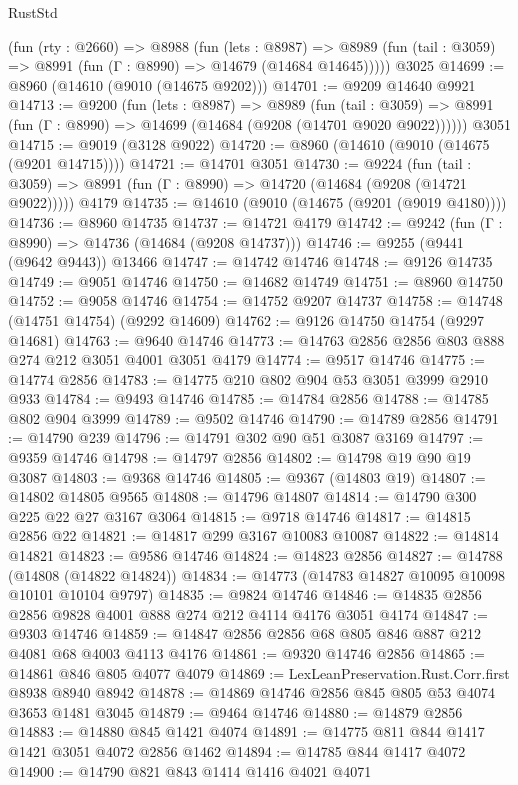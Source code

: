 \begin{lexlean}{RustStd}
\begin{coremodule}
    (fun (rty : @2660) =>
    @8988
      (fun (lets : @8987) =>
      @8989 (fun (tail : @3059) => @8991 (fun (Γ : @8990) => @14679 (@14684 @14645)))))
    @3025
@14699 := @8960 (@14610 (@9010 (@14675 @9202)))
@14701 := @9209 @14640 @9921
@14713 := @9200
    (fun (lets : @8987) =>
    @8989
      (fun (tail : @3059) =>
      @8991 (fun (Γ : @8990) => @14699 (@14684 (@9208 (@14701 @9020 @9022))))))
    @3051
@14715 := @9019 (@3128 @9022)
@14720 := @8960 (@14610 (@9010 (@14675 (@9201 @14715))))
@14721 := @14701 @3051
@14730 := @9224
    (fun (tail : @3059) => @8991 (fun (Γ : @8990) => @14720 (@14684 (@9208 (@14721 @9022)))))
    @4179
@14735 := @14610 (@9010 (@14675 (@9201 (@9019 @4180))))
@14736 := @8960 @14735
@14737 := @14721 @4179
@14742 := @9242 (fun (Γ : @8990) => @14736 (@14684 (@9208 @14737)))
@14746 := @9255 (@9441 (@9642 @9443)) @13466
@14747 := @14742 @14746
@14748 := @9126 @14735
@14749 := @9051 @14746
@14750 := @14682 @14749
@14751 := @8960 @14750
@14752 := @9058 @14746
@14754 := @14752 @9207 @14737
@14758 := @14748 (@14751 @14754) (@9292 @14609)
@14762 := @9126 @14750 @14754 (@9297 @14681)
@14763 := @9640 @14746
@14773 := @14763 @2856 @2856 @803 @888 @274 @212 @3051 @4001 @3051 @4179
@14774 := @9517 @14746
@14775 := @14774 @2856
@14783 := @14775 @210 @802 @904 @53 @3051 @3999 @2910 @933
@14784 := @9493 @14746
@14785 := @14784 @2856
@14788 := @14785 @802 @904 @3999
@14789 := @9502 @14746
@14790 := @14789 @2856
@14791 := @14790 @239
@14796 := @14791 @302 @90 @51 @3087 @3169
@14797 := @9359 @14746
@14798 := @14797 @2856
@14802 := @14798 @19 @90 @19 @3087
@14803 := @9368 @14746
@14805 := @9367 (@14803 @19)
@14807 := @14802 @14805 @9565
@14808 := @14796 @14807
@14814 := @14790 @300 @225 @22 @27 @3167 @3064
@14815 := @9718 @14746
@14817 := @14815 @2856 @22
@14821 := @14817 @299 @3167 @10083 @10087
@14822 := @14814 @14821
@14823 := @9586 @14746
@14824 := @14823 @2856
@14827 := @14788 (@14808 (@14822 @14824))
@14834 := @14773 (@14783 @14827 @10095 @10098 @10101 @10104 @9797)
@14835 := @9824 @14746
@14846 := @14835 @2856 @2856 @9828 @4001 @888 @274 @212 @4114 @4176 @3051 @4174
@14847 := @9303 @14746
@14859 := @14847 @2856 @2856 @68 @805 @846 @887 @212 @4081 @68 @4003 @4113 @4176
@14861 := @9320 @14746 @2856
@14865 := @14861 @846 @805 @4077 @4079
@14869 := LexLeanPreservation.Rust.Corr.first @8938 @8940 @8942
@14878 := @14869 @14746 @2856 @845 @805 @53 @4074 @3653 @1481 @3045
@14879 := @9464 @14746
@14880 := @14879 @2856
@14883 := @14880 @845 @1421 @4074
@14891 := @14775 @811 @844 @1417 @1421 @3051 @4072 @2856 @1462
@14894 := @14785 @844 @1417 @4072
@14900 := @14790 @821 @843 @1414 @1416 @4021 @4071

\end{coremodule}
\end{lexlean}
